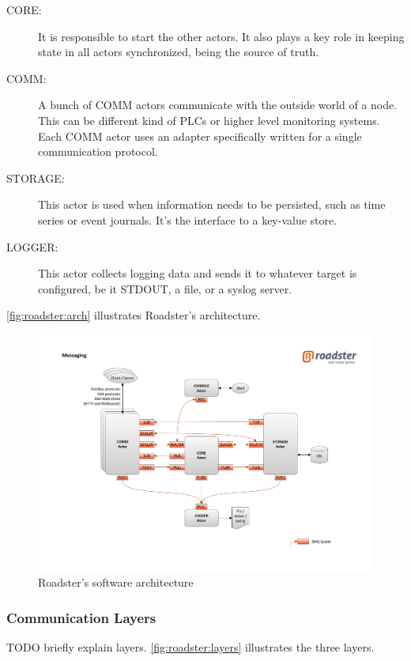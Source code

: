 \begin{description}
	\item [CORE:]
		It is responsible to start the other actors. It also plays a
		key role in keeping state in all actors synchronized, being the
		source of truth.

	\item [COMM:]
		A bunch of COMM actors communicate with the outside world of a
		node. This can be different kind of PLCs or higher level
		monitoring systems. Each COMM actor uses an adapter
		specifically written for a single communication protocol.

	\item [STORAGE:]
		This actor is used when information needs to be persisted, such
		as time series or event journals. It's the interface to a
		key-value store.

	\item [LOGGER:]
		This actor collects logging data and sends it to whatever
		target is configured, be it STDOUT, a file, or a syslog server.
\end{description}

\autoref{fig:roadster:arch} illustrates Roadster's architecture.

\begin{figure}[!ht]
	\includegraphics[trim=4cm 2cm 3.5cm 2.8cm, clip=true, width=\textwidth]{img/roadster_arch.pdf}
	\caption{Roadster's software architecture}
	\label{fig:roadster:arch}
\end{figure}

\subsubsection{Communication Layers}
TODO briefly explain layers. \autoref{fig:roadster:layers} illustrates the three layers.

